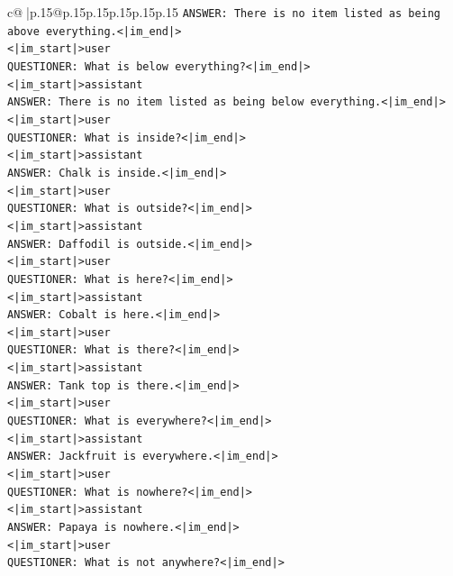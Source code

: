 \documentclass{article}
\begin{document}
{\begin{supertabular}{c@{$\;$}|p{.15\linewidth}@{}p{.15\linewidth}p{.15\linewidth}p{.15\linewidth}p{.15\linewidth}p{.15\linewidth}}
{{{\texttt{ANSWER: There is no item listed as being above everything.<|im\_end|>} \\
\texttt{<|im\_start|>user} \\
\texttt{QUESTIONER: What is below everything?<|im\_end|>} \\
\texttt{<|im\_start|>assistant} \\
\texttt{ANSWER: There is no item listed as being below everything.<|im\_end|>} \\
\texttt{<|im\_start|>user} \\
\texttt{QUESTIONER: What is inside?<|im\_end|>} \\
\texttt{<|im\_start|>assistant} \\
\texttt{ANSWER: Chalk is inside.<|im\_end|>} \\
\texttt{<|im\_start|>user} \\
\texttt{QUESTIONER: What is outside?<|im\_end|>} \\
\texttt{<|im\_start|>assistant} \\
\texttt{ANSWER: Daffodil is outside.<|im\_end|>} \\
\texttt{<|im\_start|>user} \\
\texttt{QUESTIONER: What is here?<|im\_end|>} \\
\texttt{<|im\_start|>assistant} \\
\texttt{ANSWER: Cobalt is here.<|im\_end|>} \\
\texttt{<|im\_start|>user} \\
\texttt{QUESTIONER: What is there?<|im\_end|>} \\
\texttt{<|im\_start|>assistant} \\
\texttt{ANSWER: Tank top is there.<|im\_end|>} \\
\texttt{<|im\_start|>user} \\
\texttt{QUESTIONER: What is everywhere?<|im\_end|>} \\
\texttt{<|im\_start|>assistant} \\
\texttt{ANSWER: Jackfruit is everywhere.<|im\_end|>} \\
\texttt{<|im\_start|>user} \\
\texttt{QUESTIONER: What is nowhere?<|im\_end|>} \\
\texttt{<|im\_start|>assistant} \\
\texttt{ANSWER: Papaya is nowhere.<|im\_end|>} \\
\texttt{<|im\_start|>user} \\
\texttt{QUESTIONER: What is not anywhere?<|im\_end|>} \\
}}}
\end{supertabular}}
\end{document}
